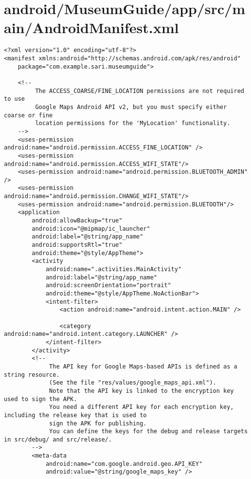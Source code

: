 \section{android/MuseumGuide/app/src/main/AndroidManifest.xml}
\begin{lstlisting}<?xml version="1.0" encoding="utf-8"?>
<manifest xmlns:android="http://schemas.android.com/apk/res/android"
    package="com.example.sari.museumguide">

    <!--
         The ACCESS_COARSE/FINE_LOCATION permissions are not required to use
         Google Maps Android API v2, but you must specify either coarse or fine
         location permissions for the 'MyLocation' functionality. 
    -->
    <uses-permission android:name="android.permission.ACCESS_FINE_LOCATION" />
    <uses-permission android:name="android.permission.ACCESS_WIFI_STATE"/>
    <uses-permission android:name="android.permission.BLUETOOTH_ADMIN" />
    <uses-permission android:name="android.permission.CHANGE_WIFI_STATE"/>
    <uses-permission android:name="android.permission.BLUETOOTH"/>
    <application
        android:allowBackup="true"
        android:icon="@mipmap/ic_launcher"
        android:label="@string/app_name"
        android:supportsRtl="true"
        android:theme="@style/AppTheme">
        <activity
            android:name=".activities.MainActivity"
            android:label="@string/app_name"
            android:screenOrientation="portrait"
            android:theme="@style/AppTheme.NoActionBar">
            <intent-filter>
                <action android:name="android.intent.action.MAIN" />

                <category android:name="android.intent.category.LAUNCHER" />
            </intent-filter>
        </activity>
        <!--
             The API key for Google Maps-based APIs is defined as a string resource.
             (See the file "res/values/google_maps_api.xml").
             Note that the API key is linked to the encryption key used to sign the APK.
             You need a different API key for each encryption key, including the release key that is used to
             sign the APK for publishing.
             You can define the keys for the debug and release targets in src/debug/ and src/release/. 
        -->
        <meta-data
            android:name="com.google.android.geo.API_KEY"
            android:value="@string/google_maps_key" />


\end{lstlisting}
